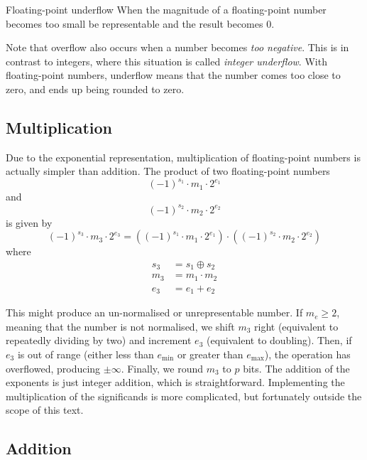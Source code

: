 \begin{definition}{Floating-point underflow}
  When the magnitude of a floating-point number becomes too small be
  representable and the result becomes $0$.
\end{definition}

Note that overflow also occurs when a number becomes \emph{too
  negative}.  This is in contrast to integers, where this situation is
called \emph{integer underflow}.  With floating-point numbers,
underflow means that the number comes too close to zero, and ends up
being rounded to zero.

\subsection{Multiplication}

Due to the exponential representation, multiplication of
floating-point numbers is actually simpler than addition.  The product
of two floating-point numbers
\[
  (-1)^{s_{1}} \cdot m_{1} \cdot 2^{e_{1}}
\]
and
\[
  (-1)^{s_{2}} \cdot m_{2} \cdot 2^{e_{2}}
\]
is given by
\begin{equation}
  (-1)^{s_{3}} \cdot m_{3} \cdot 2^{e_{3}} = ((-1)^{s_{1}} \cdot m_{1} \cdot 2^{e_{1}}) \cdot ((-1)^{s_{2}} \cdot m_{2} \cdot 2^{e_{2}})
\end{equation}
  where
  \begin{align}
    s_{3} &= s_{1} \oplus s_{2} \\
    m_{3} &= m_{1} \cdot m_{2} \\
    e_{3} &= e_{1} + e_{2}
  \end{align}

  This might produce an un-normalised or unrepresentable number.  If
  $m_{e}\geq{}2$, meaning that the number is not normalised, we shift
  $m_{3}$ right (equivalent to repeatedly dividing by two) and
  increment $e_{3}$ (equivalent to doubling).  Then, if $e_{3}$ is out
  of range (either less than $e_{\text{min}}$ or greater than
  $e_{\text{max}}$), the operation has overflowed, producing
  $\pm\infty$.  Finally, we round $m_{3}$ to $p$ bits.  The addition
  of the exponents is just integer addition, which is straightforward.
  Implementing the multiplication of the significands is more
  complicated, but fortunately outside the scope of this text.

\subsection{Addition}

